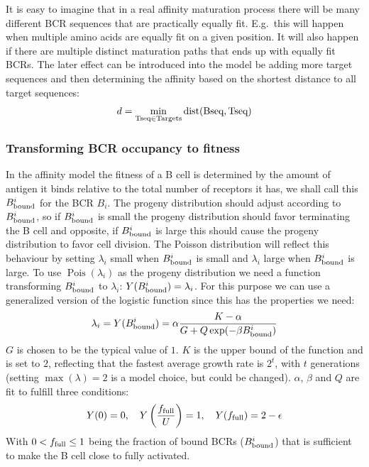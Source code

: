 It is easy to imagine that in a real affinity maturation process there will be many different BCR sequences that are practically equally fit.
E.g.\ this will happen when multiple amino acids are equally fit on a given position.
It will also happen if there are multiple distinct maturation paths that ends up with equally fit BCRs.
The later effect can be introduced into the model be adding more target sequences and then determining the affinity based on the shortest distance to all target sequences:
$$
d = \mathop{\mathrm{\min}}\limits_{\text{Tseq} \in \text{Targets}} \operatorname{dist}(\text{Bseq}, \text{Tseq}) 
$$






\subsubsection{Transforming BCR occupancy to fitness}
In the affinity model the fitness of a B cell is determined by the amount of antigen it binds relative to the total number of receptors it has, we shall call this $B^i_{\text{bound}}$ for the BCR $B_i$.
The progeny distribution should adjust according to $B^i_{\text{bound}}$, so if $B^i_{\text{bound}}$ is small the progeny distribution should favor terminating the B cell and opposite, if $B^i_{\text{bound}}$ is large this should cause the progeny distribution to favor cell division.
The Poisson distribution will reflect this behaviour by setting $\lambda_i$ small when $B^i_{\text{bound}}$ is small and $\lambda_i$ large when $B^i_{\text{bound}}$ is large.
To use $\operatorname{Pois}(\lambda_i)$ as the progeny distribution we need a function transforming $B^i_{\text{bound}}$ to $\lambda_i$: $Y(B^i_{\text{bound}}) = \lambda_i$.
For this purpose we can use a generalized version of the logistic function since this has the properties we need:
\begin{equation}
\lambda_i = Y(B^i_{\text{bound}}) = \alpha \frac{K - \alpha}{G + Q \exp(-\beta B^i_{\text{bound}})}
  \label{eq:BA_trans}
\end{equation}
$G$ is chosen to be the typical value of $1$.
$K$ is the upper bound of the function and is set to $2$, reflecting that the fastest average growth rate is $2^t$, with $t$ generations (setting $\operatorname{max}(\lambda) = 2$ is a model choice, but could be changed).
$\alpha$, $\beta$ and $Q$ are fit to fulfill three conditions:
\begin{equation}
Y(0) = 0, \ \ \ Y \left(\frac{f_{\text{full}}}{U} \right) = 1, \ \ \ Y(f_{\text{full}}) = 2 - \epsilon
  \label{eq:BA_cond}
\end{equation}
With $0 < f_{\text{full}} \leq 1$ being the fraction of bound BCRs ($B^i_{\text{bound}}$) that is sufficient to make the B cell close to fully activated.
